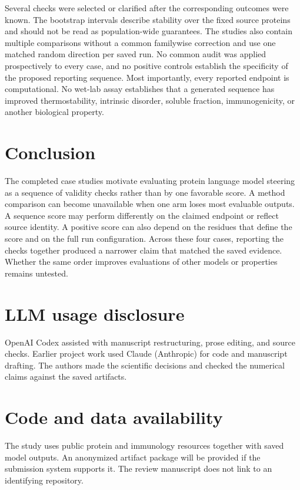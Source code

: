 \documentclass{article}
\begin{document}
Several checks were selected or clarified after the corresponding outcomes
were known. The bootstrap intervals describe stability over the fixed source
proteins and should not be read as population-wide guarantees. The studies
also contain multiple comparisons without a common familywise correction and
use one matched random direction per saved run. No common audit was applied
prospectively to every case, and no positive controls establish the specificity
of the proposed reporting sequence. Most importantly, every reported endpoint
is computational. No wet-lab assay establishes that a generated sequence has
improved thermostability, intrinsic disorder, soluble fraction,
immunogenicity, or another biological property.

\section{Conclusion}

The completed case studies motivate evaluating protein language model
steering as a sequence of validity checks rather than by one favorable score.
A method comparison can become unavailable when one arm loses most evaluable
outputs. A sequence score may perform differently on the claimed endpoint or
reflect source identity. A positive score can also depend on the residues that
define the score and on the full run configuration. Across these four cases,
reporting the checks together produced a narrower claim that matched the saved
evidence. Whether the same order improves evaluations of other models or
properties remains untested.

\section*{LLM usage disclosure}
OpenAI Codex assisted with manuscript restructuring, prose editing, and source
checks. Earlier project work used Claude (Anthropic) for code and manuscript
drafting. The authors made the scientific decisions and checked the numerical
claims against the saved artifacts.

\section*{Code and data availability}
The study uses public protein and immunology resources together with saved
model outputs. An anonymized artifact package will be provided if the
submission system supports it. The review manuscript does not link to an
identifying repository.
\end{document}
